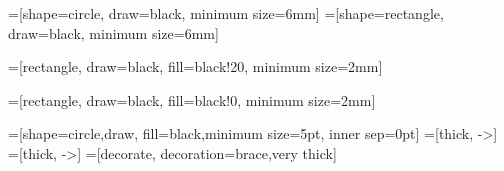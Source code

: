 \usepackage{tikz}
\usepackage{pgf}
\usetikzlibrary{positioning}
\usetikzlibrary{shadows,shapes,arrows}
\usetikzlibrary{calc,3d}
\usetikzlibrary{fit}
\usetikzlibrary{decorations.pathmorphing}
\usetikzlibrary{trees} 

=[shape=circle, draw=black, minimum size=6mm]
=[shape=rectangle, draw=black, minimum size=6mm]

=[rectangle, draw=black, fill=black!20, minimum size=2mm]

=[rectangle, draw=black, fill=black!0, minimum size=2mm]

=[shape=circle,draw, fill=black,minimum size=5pt, inner sep=0pt]
=[thick, ->]
=[thick, ->]
=[decorate, decoration=brace,very thick] %

\usepackage{array} %

\newcommand\diag[4]{%
  \multicolumn{1}{p{#2}|}{\hskip-\tabcolsep
  $\vcenter{\begin{tikzpicture}[baseline=0,anchor=south west,inner sep=#1]
  \path[use as bounding box] (0,0) rectangle (#2+2\tabcolsep,\baselineskip);
  \node[minimum width={#2+2\tabcolsep},minimum height=\baselineskip+\extrarowheight] (box) {};
  \draw (box.north west) -- (box.south east);
  \node[anchor=south west] at (box.south west) {#3};
  \node[anchor=north east] at (box.north east) {#4};
 \end{tikzpicture}}$\hskip-\tabcolsep}}


\newcommand{\MYbarplot}[3]{ %
\setcounter{MYstep}{0}
\begin{tikzpicture}[baseline=0pt]
  \pgfplothandlerycomb
  \pgfplotstreamstart
  \foreach \MYheight in {#1} {
    \pgfplotstreampoint{\pgfpoint{#2*\value{MYstep}}{#3*\MYheight}};
    \addtocounter{MYstep}{1}
  }
  \pgfplotstreamend
  \pgfsetlinewidth{.6*#2}
  \color{black}
  \pgfsetstrokecolor{black}
  \pgfusepath{stroke}
\end{tikzpicture}
}



